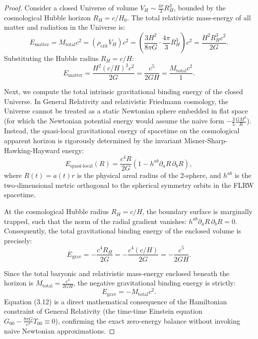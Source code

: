 \documentclass[11pt,a4paper]{article}
\theoremstyle{definition}
\begin{document}
\begin{proof}
Consider a closed Universe of volume $V_H \sim \frac{4\pi}{3} R_H^3$, bounded by the cosmological Hubble horizon $R_H = c/H_0$. The total relativistic mass-energy of all matter and radiation in the Universe is:
\begin{equation}\label{eq:3.8}\tag{3.8}
E_{\text{matter}} = M_{\text{total}} c^2 = \left( \rho_{\text{crit}} V_H \right) c^2 = \left( \frac{3 H^2}{8\pi G} \cdot \frac{4\pi}{3} R_H^3 \right) c^2 = \frac{H^2 R_H^3 c^2}{2 G}.
\end{equation}
Substituting the Hubble radius $R_H = c/H$:
\begin{equation}\label{eq:3.9}\tag{3.9}
E_{\text{matter}} = \frac{H^2 (c/H)^3 c^2}{2 G} = \frac{c^5}{2 G H} = \frac{M_{\text{total}} c^2}{1}.
\end{equation}

Next, we compute the total intrinsic gravitational binding energy of the closed Universe. In General Relativity and relativistic Friedmann cosmology, the Universe cannot be treated as a static Newtonian sphere embedded in flat space (for which the Newtonian potential energy would assume the naive form $-\frac{3}{5} \frac{G M^2}{R}$). Instead, the quasi-local gravitational energy of spacetime on the cosmological apparent horizon is rigorously determined by the invariant Misner-Sharp-Hawking-Hayward energy:
\begin{equation}\label{eq:3.10}\tag{3.10}
E_{\text{quasi-local}}(R) = \frac{c^4 R}{2G} \left( 1 - h^{ab} \partial_a R \, \partial_b R \right),
\end{equation}
where $R(t) = a(t) r$ is the physical areal radius of the 2-sphere, and $h^{ab}$ is the two-dimensional metric orthogonal to the spherical symmetry orbits in the FLRW spacetime.

At the cosmological Hubble radius $R_H = c/H$, the boundary surface is marginally trapped, such that the norm of the radial gradient vanishes: $h^{ab} \partial_a R \, \partial_b R = 0$. Consequently, the total gravitational binding energy of the enclosed volume is precisely:
\begin{equation}\label{eq:3.11}\tag{3.11}
E_{\text{grav}} = -\frac{c^4 R_H}{2G} = -\frac{c^4 (c/H)}{2G} = -\frac{c^5}{2GH}.
\end{equation}

Since the total baryonic and relativistic mass-energy enclosed beneath the horizon is $M_{\text{total}} = \frac{c^3}{2GH}$, the negative gravitational binding energy is strictly:
\begin{equation}\label{eq:3.12}\tag{3.12}
E_{\text{grav}} = -M_{\text{total}} c^2.
\end{equation}
Equation (3.12) is a direct mathematical consequence of the Hamiltonian constraint of General Relativity (the time-time Einstein equation $G_{00} - \frac{8\pi G}{c^4} T_{00} \equiv 0$), confirming the exact zero-energy balance without invoking naive Newtonian approximations.


\end{proof}
\end{document}

